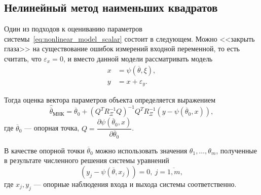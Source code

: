\subsection{Нелинейный метод наименьших квадратов}

Один из подходов к оцениванию параметров системы~\eqref{eq:nonlinear_model_scalar}
состоит в следующем.
Можно <<закрыть глаза>> на существование ошибок измерений
входной переменной, то есть считать, что \( \varepsilon_x = 0 \),
и вместо данной модели рассматривать модель
\begin{equation*}
  \begin{aligned}
  x &= \psi(\overline{\theta}, \xi), \\
  y &= x + \varepsilon_y.
  \end{aligned}
\end{equation*}

Тогда оценка вектора параметров объекта определяется выражением~\cite{mukha_2009}
\begin{equation}
  \label{eq:nonlinear_lse}
  \hat{\overline{\theta}}_{\text{МНК}} =
  \overline{\theta}_0 + (Q^T R^{-1}_{\Xi} Q)^{-1} Q^T R^{-1}_{\Xi} (y - \psi(\overline{\theta}_0, x)),
\end{equation}
где \( \overline{\theta}_0 \) --- опорная точка,
\( Q = \dfrac{\partial \psi(\overline{\theta}_0, x) }{ \partial \overline{\theta}_0 } \).

В качестве опорной точки \( \overline{\theta}_0 \) можно использовать значения
\( \theta_1, \dotsc, \theta_m \),
полученные в результате численного решения системы уравнений
\begin{equation}
  \label{eq:nonlinear_basic}
  (y_j - \psi( \overline{\theta}, x_j )) = 0, \: j = \overline{1,m},
\end{equation}
где \( x_j, y_j \) --- опорные наблюдения входа и выхода системы соответственно.

